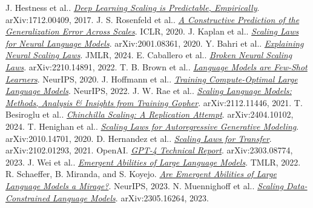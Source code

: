 \documentclass[UTF8,10pt,a4paper,fontset=none]{ctexart}
\begin{document}
\clearpage
{}
{}
\begin{thebibliography}{99}
\small
\setlength{\itemsep}{1pt}
\setlength{\parskip}{0pt}
\newcommand{\bibentry}[5]{#1. \href{#5}{\textit{#2}}. #3, #4.}

 \bibentry{J. Hestness et al.}{Deep Learning Scaling is Predictable, Empirically}{arXiv:1712.00409}{2017}{https://arxiv.org/abs/1712.00409}
 \bibentry{J. S. Rosenfeld et al.}{A Constructive Prediction of the Generalization Error Across Scales}{ICLR}{2020}{https://arxiv.org/abs/1909.12673}
 \bibentry{J. Kaplan et al.}{Scaling Laws for Neural Language Models}{arXiv:2001.08361}{2020}{https://arxiv.org/abs/2001.08361}
 \bibentry{Y. Bahri et al.}{Explaining Neural Scaling Laws}{JMLR}{2024}{https://arxiv.org/abs/2102.06701}
 \bibentry{E. Caballero et al.}{Broken Neural Scaling Laws}{arXiv:2210.14891}{2022}{https://arxiv.org/abs/2210.14891}
 \bibentry{T. B. Brown et al.}{Language Models are Few-Shot Learners}{NeurIPS}{2020}{https://arxiv.org/abs/2005.14165}
 \bibentry{J. Hoffmann et al.}{Training Compute-Optimal Large Language Models}{NeurIPS}{2022}{https://doi.org/10.48550/arXiv.2203.15556}
 \bibentry{J. W. Rae et al.}{Scaling Language Models: Methods, Analysis \& Insights from Training Gopher}{arXiv:2112.11446}{2021}{https://arxiv.org/abs/2112.11446}
 \bibentry{T. Besiroglu et al.}{Chinchilla Scaling: A Replication Attempt}{arXiv:2404.10102}{2024}{https://arxiv.org/abs/2404.10102}
 \bibentry{T. Henighan et al.}{Scaling Laws for Autoregressive Generative Modeling}{arXiv:2010.14701}{2020}{https://arxiv.org/abs/2010.14701}
 \bibentry{D. Hernandez et al.}{Scaling Laws for Transfer}{arXiv:2102.01293}{2021}{https://arxiv.org/abs/2102.01293}
 \bibentry{OpenAI}{GPT-4 Technical Report}{arXiv:2303.08774}{2023}{https://arxiv.org/abs/2303.08774}
 \bibentry{J. Wei et al.}{Emergent Abilities of Large Language Models}{TMLR}{2022}{https://arxiv.org/abs/2206.07682}
 \bibentry{R. Schaeffer, B. Miranda, and S. Koyejo}{Are Emergent Abilities of Large Language Models a Mirage?}{NeurIPS}{2023}{https://arxiv.org/abs/2304.15004}
 \bibentry{N. Muennighoff et al.}{Scaling Data-Constrained Language Models}{arXiv:2305.16264}{2023}{https://arxiv.org/abs/2305.16264}

\end{thebibliography}
\end{document}
